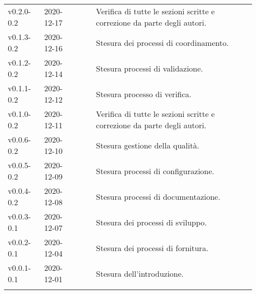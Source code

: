 {\begin{longtable}{C{.131777\freewidth} C{.134036\freewidth} C{.263554\freewidth} C{.188254\freewidth} C{.282379\freewidth}}
		v0.2.0-0.2 & 2020-12-17 & \Giosue{} & \ver{} & Verifica di tutte le sezioni scritte e correzione da parte degli autori. \\ 
		v0.1.3-0.2 & 2020-12-16 & \Lucrezia{} & \ana{} & Stesura dei processi di coordinamento. \\ 
		v0.1.2-0.2 & 2020-12-14 & \Davide{} & \ana{} & Stesura processi di validazione. \\ 
		v0.1.1-0.2 & 2020-12-12 & \Francesco{} & \ana{} & Stesura processo di verifica. \\ 		
		
		v0.1.0-0.2 & 2020-12-11 & \Matteo{} &  \ver{} & Verifica di tutte le sezioni scritte e correzione da parte degli autori. \\
		v0.0.6-0.2 & 2020-12-10 & \Davide{} &  \ana{} & Stesura gestione della qualità. \\
		v0.0.5-0.2 & 2020-12-09 & \Francesco{} &  \ana{} & Stesura processi di configurazione. \\
		v0.0.4-0.2 & 2020-12-08 & \Lucrezia{} &  \ana{} & Stesura processi di documentazione. \\
		
		
		v0.0.3-0.1 & 2020-12-07 & \Francesco{} &  \ana{} & Stesura dei processi di sviluppo. \\
		v0.0.2-0.1 & 2020-12-04 & \Davide{} &  \ana{} & Stesura dei processi di fornitura. \\
		v0.0.1-0.1 & 2020-12-01 & \Lucrezia{} &  \ana{} & Stesura dell'introduzione. \\


		\bottomrule
		\hiderowcolors
	\end{longtable}
}